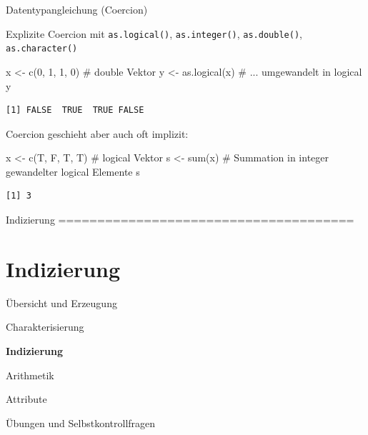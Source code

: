 \documentclass[
  8pt,
  ignorenonframetext,
]{beamer}
\newenvironment{Shaded}{\begin{snugshade}}{\end{snugshade}}
\newcommand{\CommentTok}[1]{\textcolor[rgb]{0.37,0.37,0.37}{#1}}
\newcommand{\DecValTok}[1]{\textcolor[rgb]{0.68,0.00,0.00}{#1}}
\newcommand{\FunctionTok}[1]{\textcolor[rgb]{0.28,0.35,0.67}{#1}}
\newcommand{\NormalTok}[1]{\textcolor[rgb]{0.00,0.23,0.31}{#1}}
\newcommand{\OtherTok}[1]{\textcolor[rgb]{0.00,0.23,0.31}{#1}}
\begin{document}
\begin{frame}[fragile]{Datentypangleichung (Coercion)}
\protect\hypertarget{datentypangleichung-coercion-1}{}
\vspace{2mm}

\justifying
\small

Explizite Coercion mit \texttt{as.logical()}, \texttt{as.integer()},
\texttt{as.double()}, \texttt{as.character()} \vspace{1mm}

\footnotesize

\begin{Shaded}
\begin{Highlighting}[]
\NormalTok{x }\OtherTok{\textless{}{-}} \FunctionTok{c}\NormalTok{(}\DecValTok{0}\NormalTok{, }\DecValTok{1}\NormalTok{, }\DecValTok{1}\NormalTok{, }\DecValTok{0}\NormalTok{)        }\CommentTok{\# double Vektor}
\NormalTok{y }\OtherTok{\textless{}{-}} \FunctionTok{as.logical}\NormalTok{(x)        }\CommentTok{\# ... umgewandelt in logical}
\NormalTok{y}
\end{Highlighting}
\end{Shaded}

\begin{verbatim}
[1] FALSE  TRUE  TRUE FALSE
\end{verbatim}

\vspace{3mm}
\small

Coercion geschieht aber auch oft implizit: \vspace{1mm}

\footnotesize

\begin{Shaded}
\begin{Highlighting}[]
\NormalTok{x }\OtherTok{\textless{}{-}} \FunctionTok{c}\NormalTok{(T, F, T, T)        }\CommentTok{\# logical Vektor}
\NormalTok{s }\OtherTok{\textless{}{-}} \FunctionTok{sum}\NormalTok{(x)               }\CommentTok{\# Summation in integer gewandelter logical Elemente}
\NormalTok{s}
\end{Highlighting}
\end{Shaded}

\begin{verbatim}
[1] 3
\end{verbatim}

\vfill
\end{frame}

\begin{frame}[plain]{Indizierung ======================================}
\protect\hypertarget{indizierung}{}
\AtBeginSection{}
\section{Indizierung}

\large
{}
\vfill

Übersicht und Erzeugung

Charakterisierung

\textbf{Indizierung}

Arithmetik

Attribute

Übungen und Selbstkontrollfragen
\end{frame}
\end{document}
